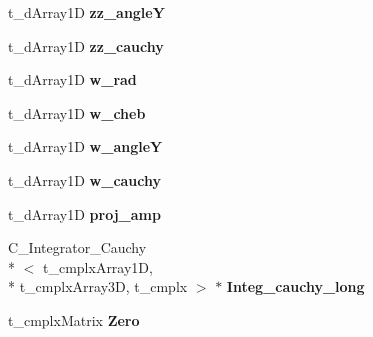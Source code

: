 \begin{DoxyCompactItemize}
\item 
\hypertarget{class_c___b_s_e___hadron___base_aa627668a9b60cecb73582733307767d6}{t\-\_\-d\-Array1\-D {\bfseries zz\-\_\-angle\-Y}}\label{class_c___b_s_e___hadron___base_aa627668a9b60cecb73582733307767d6}

\item 
\hypertarget{class_c___b_s_e___hadron___base_ac9d4d825bf81442c32a8108399f08682}{t\-\_\-d\-Array1\-D {\bfseries zz\-\_\-cauchy}}\label{class_c___b_s_e___hadron___base_ac9d4d825bf81442c32a8108399f08682}

\item 
\hypertarget{class_c___b_s_e___hadron___base_a0b0dd03823e4e577a8b08966fba4754a}{t\-\_\-d\-Array1\-D {\bfseries w\-\_\-rad}}\label{class_c___b_s_e___hadron___base_a0b0dd03823e4e577a8b08966fba4754a}

\item 
\hypertarget{class_c___b_s_e___hadron___base_a02c79b8461bf55d4dc18c2d4fccc2f25}{t\-\_\-d\-Array1\-D {\bfseries w\-\_\-cheb}}\label{class_c___b_s_e___hadron___base_a02c79b8461bf55d4dc18c2d4fccc2f25}

\item 
\hypertarget{class_c___b_s_e___hadron___base_a44264ac65d24bde80606df67befe7a7d}{t\-\_\-d\-Array1\-D {\bfseries w\-\_\-angle\-Y}}\label{class_c___b_s_e___hadron___base_a44264ac65d24bde80606df67befe7a7d}

\item 
\hypertarget{class_c___b_s_e___hadron___base_ab928ada326422746154f37d023898acd}{t\-\_\-d\-Array1\-D {\bfseries w\-\_\-cauchy}}\label{class_c___b_s_e___hadron___base_ab928ada326422746154f37d023898acd}

\item 
\hypertarget{class_c___b_s_e___hadron___base_a4ed7931645ab7d056d6e3eb6775cd607}{t\-\_\-d\-Array1\-D {\bfseries proj\-\_\-amp}}\label{class_c___b_s_e___hadron___base_a4ed7931645ab7d056d6e3eb6775cd607}

\item 
\hypertarget{class_c___b_s_e___hadron___base_a7a4939890a7b0948a996fbf7eee6b967}{C\-\_\-\-Integrator\-\_\-\-Cauchy\\*
$<$ t\-\_\-cmplx\-Array1\-D, \\*
t\-\_\-cmplx\-Array3\-D, t\-\_\-cmplx $>$ $\ast$ {\bfseries Integ\-\_\-cauchy\-\_\-long}}\label{class_c___b_s_e___hadron___base_a7a4939890a7b0948a996fbf7eee6b967}

\item 
\hypertarget{class_c___b_s_e___hadron___base_a85f66a5ade4aa09ad95d885ff75cf914}{t\-\_\-cmplx\-Matrix {\bfseries Zero}}\label{class_c___b_s_e___hadron___base_a85f66a5ade4aa09ad95d885ff75cf914}


\end{DoxyCompactItemize}
